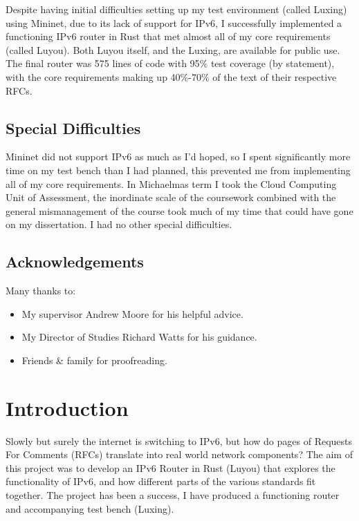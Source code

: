 \documentclass[12pt,a4paper,twoside,openright]{report}
\begin{document}
Despite having initial difficulties setting up my test environment (called Luxing) using Mininet\cite{mininet}, due to its lack of support for IPv6, I successfully implemented a functioning IPv6 router in Rust that met almost all of my core requirements (called Luyou). Both Luyou itself, and the Luxing, are available for public use.  The final router was 575 lines of code with 95\% test coverage (by statement), with the core requirements making up 40\%-70\% of the text of their respective RFCs. 

\section*{Special Difficulties}

Mininet did not support IPv6 as much as I'd hoped, so I spent significantly more time on my test bench than I had planned, this prevented me from implementing all of my core requirements.  In Michaelmas term I took the Cloud Computing Unit of Assessment, the inordinate scale of the coursework combined with the general mismanagement of the course took much of my time that could have gone on my dissertation.  I had no other special difficulties.

\tableofcontents
{}
\listoffigures
{}

\newpage
\section*{Acknowledgements}

Many thanks to:
\begin{itemize}
\item My supervisor Andrew Moore for his helpful advice.
\item My Director of Studies Richard Watts for his guidance.
\item Friends \& family for proofreading.
\end{itemize}


\pagestyle{headings}

\chapter{Introduction}
\label{chap::introduction}
Slowly but surely the internet is switching to IPv6\cite{ipv6_rfc}, but how do pages of Requests For Comments (RFCs) translate into real world network components? The aim of this project was to develop an IPv6 Router in Rust (Luyou) that explores the functionality of IPv6, and how different parts of the various standards fit together. The project has been a success, I have produced a functioning router and accompanying test bench (Luxing).
\end{document}
